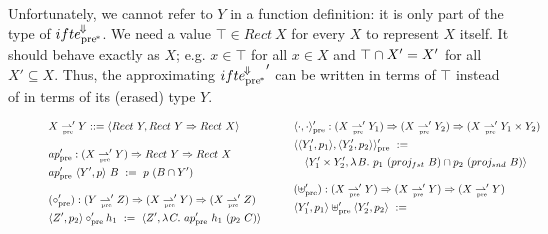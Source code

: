 \documentclass[preprint]{sigplanconf}
\newcommand{\pto}{\rightharpoonup}
\newcommand{\conv}{^{\mspace{-2mu}\Downarrow\mspace{-2mu}}}
\newcommand{\arrowconvif}{\ensuremath{ifte\conv}}
\newcommand{\pre}{_\mathrm{pre}}
\newcommand{\ppre}{_\mathrm{pre^{\mspace{-2mu}*}}}
\newcommand{\convifppre}{\arrowconvif\ppre}
\newcommand{\prepto}{\pto_{\mspace{-19mu}\pre}}
\begin{document}
Unfortunately, we cannot refer to $Y$ in a function definition: it is only part of the type of $\convifppre$.
We need a value $\top \in Rect~X$ for every $X$ to represent $X$ itself.
It should behave exactly as $X$; e.g. $x \in \top$ for all $x \in X$ and $\top \cap X' = X'$ for all $X' \subseteq X$.
Thus, the approximating ${\convifppre}'$ can be written in terms of $\top$ instead of in terms of its (erased) type $Y$.

\begin{figure*}[t]\centering
\begin{minipage}{\textwidth}
\begin{align*}
\begin{aligned}[t]
	&\begin{aligned}[t]
		&X \prepto' Y ::= \pair{Rect~Y, Rect~Y \tto Rect~X}
	\end{aligned} \\
\\[-6pt]
	&\begin{aligned}[t]
		&ap\pre' : (X \prepto' Y) \tto Rect~Y \tto Rect~X \\
		&ap\pre'~\pair{Y',p}~B \ := \ p~(B \i Y') 
	\end{aligned} \\
\\[-6pt]
	&\begin{aligned}[t]
		&(\circ\pre') : (Y \prepto' Z) \tto (X \prepto' Y) \tto (X \prepto' Z) \\
		&\pair{Z',p_2} \circ\pre' h_1 \ := \ \pair{Z', \fun{C}{ap\pre'~h_1~(p_2~C)}}
	\end{aligned} \\
\end{aligned}
&\tab\tab\tab
\begin{aligned}[t]
	&\begin{aligned}[t]
		&\pair{\cdot,\cdot}\pre' : (X \prepto' Y_1) \tto (X \prepto' Y_2) \tto (X \prepto' Y_1 \times Y_2) \\
		&\pair{\pair{Y_1',p_1},\pair{Y_2',p_2}}\pre' \ := \\
		&\tab\pair{Y_1' \times Y_2',\fun{B}{p_1~(proj_{fst}~B) \i p_2~(proj_{snd}~B)}}
	\end{aligned} \\
\\[-6pt]
	&\begin{aligned}[t]
		&(\uplus\pre') : (X \prepto' Y) \tto (X \prepto' Y) \tto (X \prepto' Y) \\
		&\pair{Y_1',p_1} \uplus\pre' \pair{Y_2',p_2} \ := \\

\end{aligned}
\end{aligned}
\end{align*}
\end{minipage}
\end{figure*}
\end{document}
